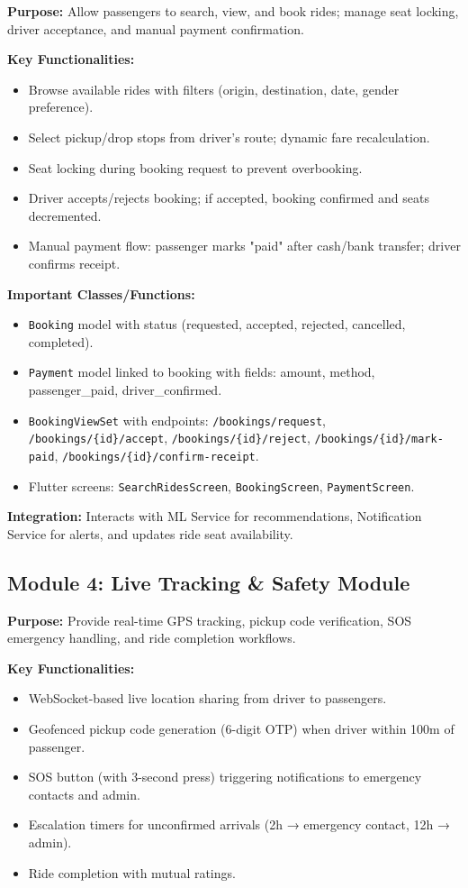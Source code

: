 \textbf{Purpose:} Allow passengers to search, view, and book rides; manage seat locking, driver acceptance, and manual payment confirmation.

\textbf{Key Functionalities:}
\begin{itemize}
    \item Browse available rides with filters (origin, destination, date, gender preference).
    \item Select pickup/drop stops from driver's route; dynamic fare recalculation.
    \item Seat locking during booking request to prevent overbooking.
    \item Driver accepts/rejects booking; if accepted, booking confirmed and seats decremented.
    \item Manual payment flow: passenger marks "paid" after cash/bank transfer; driver confirms receipt.
\end{itemize}

\textbf{Important Classes/Functions:}
\begin{itemize}
    \item \texttt{Booking} model with status (requested, accepted, rejected, cancelled, completed).
    \item \texttt{Payment} model linked to booking with fields: amount, method, passenger\_paid, driver\_confirmed.
    \item \texttt{BookingViewSet} with endpoints: \texttt{/bookings/request}, \texttt{/bookings/\{id\}/accept}, \texttt{/bookings/\{id\}/reject}, \texttt{/bookings/\{id\}/mark-paid}, \texttt{/bookings/\{id\}/confirm-receipt}.
    \item Flutter screens: \texttt{SearchRidesScreen}, \texttt{BookingScreen}, \texttt{PaymentScreen}.
\end{itemize}

\textbf{Integration:} Interacts with ML Service for recommendations, Notification Service for alerts, and updates ride seat availability.

\subsection{Module 4: Live Tracking \& Safety Module}

\textbf{Purpose:} Provide real-time GPS tracking, pickup code verification, SOS emergency handling, and ride completion workflows.

\textbf{Key Functionalities:}
\begin{itemize}
    \item WebSocket-based live location sharing from driver to passengers.
    \item Geofenced pickup code generation (6-digit OTP) when driver within 100m of passenger.
    \item SOS button (with 3-second press) triggering notifications to emergency contacts and admin.
    \item Escalation timers for unconfirmed arrivals (2h → emergency contact, 12h → admin).
    \item Ride completion with mutual ratings.
\end{itemize}

